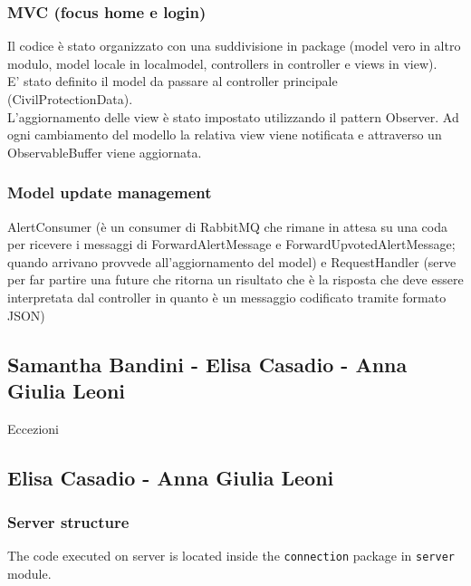 \documentclass[a4paper,12pt]{report}
\begin{document}
\subsubsection{MVC (focus home e login)}
Il codice è stato organizzato con una suddivisione in package (model vero in altro modulo, model locale in localmodel, controllers in controller e views in view).\\
E' stato definito il model da passare al controller principale (CivilProtectionData).\\
L'aggiornamento delle view è stato impostato utilizzando il pattern Observer. Ad ogni cambiamento del modello la relativa view viene notificata e attraverso un ObservableBuffer viene aggiornata.\\


\subsubsection{Model update management}
AlertConsumer (è un consumer di RabbitMQ che rimane in attesa su una coda per ricevere i messaggi di ForwardAlertMessage e ForwardUpvotedAlertMessage; quando arrivano provvede all'aggiornamento del model) e RequestHandler (serve per far partire una future che ritorna un risultato che è la risposta che deve essere interpretata dal controller in quanto è un messaggio codificato tramite formato JSON)






\subsection{Samantha Bandini - Elisa Casadio - Anna Giulia Leoni}
Eccezioni

\subsection{Elisa Casadio - Anna Giulia Leoni}
\subsubsection{Server structure}
The code executed on server is located inside the \texttt{connection} package in \texttt{server} module.
\end{document}
